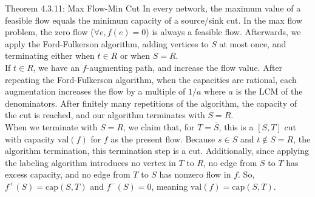 \documentclass[10pt]{extarticle}
\begin{document}
  \begin{problem}{Theorem 4.3.11: Max Flow-Min Cut}
    In every network, the maximum value of a feasible flow equals the minimum capacity of a source/sink cut.
    \tcblower
    In the max flow problem, the zero flow ($\forall e, f(e) = 0$) is always a feasible flow. Afterwards, we apply the Ford-Fulkerson algorithm, adding vertices to $S$ at most once, and terminating either when $t\in R$ or when $S = R$.\\

    If $t\in R$, we have an $f$-augmenting path, and increase the flow value. After repeating the Ford-Fulkerson algorithm, when the capacities are rational, each augmentation increases the flow by a multiple of $1/a$ where $a$ is the LCM of the denominators. After finitely many repetitions of the algorithm, the capacity of the cut is reached, and our algorithm terminates with $S=R$.\\

    When we terminate with $S=R$, we claim that, for $T = \overline{S}$, this is a $[S,T]$ cut with capacity $\textrm{val}(f)$ for $f$ as the present flow. Because $s\in S$ and $t\notin S = R$, the algorithm termination, this termination step is a cut. Additionally, since applying the labeling algorithm introduces no vertex in $T$ to $R$, no edge from $S$ to $T$ has excess capacity, and no edge from $T$ to $S$ has nonzero flow in $f$. So, $f^+(S) = \textrm{cap}(S,T)$ and $f^-(S) = 0$, meaning $\textrm{val}(f) = \textrm{cap}(S,T)$.
  \end{problem}
\end{document}
